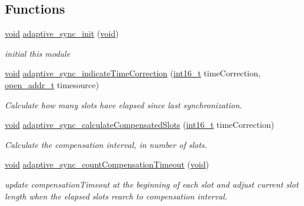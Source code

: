 \subsection*{Functions}
\begin{DoxyCompactItemize}
\item 
\hyperlink{usb__devapi_8h_afabf60e7f57651d6d595a02c75f07cd0}{void} \hyperlink{group__adpativesync_ga89deb11d98af3e4cb4cf15c83befc6c9}{adaptive\+\_\+sync\+\_\+init} (\hyperlink{usb__devapi_8h_afabf60e7f57651d6d595a02c75f07cd0}{void})
\begin{DoxyCompactList}\small\item\em initial this module \end{DoxyCompactList}\item 
\hyperlink{usb__devapi_8h_afabf60e7f57651d6d595a02c75f07cd0}{void} \hyperlink{group__adpativesync_ga94a319cb9d518d12cd800853d8b0d7fc}{adaptive\+\_\+sync\+\_\+indicate\+Time\+Correction} (\hyperlink{_p_e___types_8h_a932e6ccc3d54c58f761c1aead83bd6d7}{int16\+\_\+t} time\+Correction, \hyperlink{structopen__addr__t}{open\+\_\+addr\+\_\+t} timesource)
\begin{DoxyCompactList}\small\item\em Calculate how many slots have elapsed since last synchronization. \end{DoxyCompactList}\item 
\hyperlink{usb__devapi_8h_afabf60e7f57651d6d595a02c75f07cd0}{void} \hyperlink{group__adpativesync_ga4754d7eb03173c9d65256a04abbdd3a1}{adaptive\+\_\+sync\+\_\+calculate\+Compensated\+Slots} (\hyperlink{_p_e___types_8h_a932e6ccc3d54c58f761c1aead83bd6d7}{int16\+\_\+t} time\+Correction)
\begin{DoxyCompactList}\small\item\em Calculate the compensation interval, in number of slots. \end{DoxyCompactList}\item 
\hyperlink{usb__devapi_8h_afabf60e7f57651d6d595a02c75f07cd0}{void} \hyperlink{group__adpativesync_ga04865190ddec1a2e91d74bc09f69e7b3}{adaptive\+\_\+sync\+\_\+count\+Compensation\+Timeout} (\hyperlink{usb__devapi_8h_afabf60e7f57651d6d595a02c75f07cd0}{void})
\begin{DoxyCompactList}\small\item\em update compensation\+Timeout at the beginning of each slot and adjust current slot length when the elapsed slots rearch to compensation interval. \end{DoxyCompactList}\item 

\end{DoxyCompactItemize}
